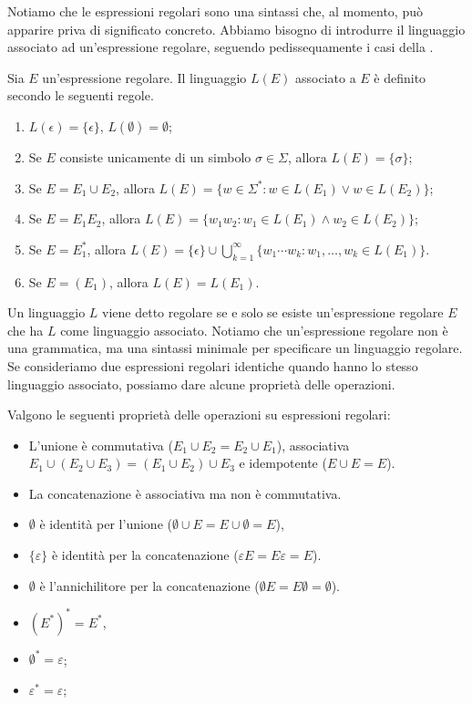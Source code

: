 Notiamo che le espressioni regolari sono una sintassi che, al momento, può apparire priva di significato concreto.
Abbiamo bisogno di introdurre il linguaggio associato ad un'espressione regolare, seguendo pedissequamente i casi della .

\begin{definition}\label{def:regex-linguaggio}
	Sia $E$ un'espressione regolare. Il linguaggio $L(E)$ associato a $E$ è definito secondo le seguenti regole.
	\begin{enumerate}
		\item $L(\epsilon) = \{\epsilon\}$, $L(\emptyset) = \emptyset$;
		\item Se $E$ consiste unicamente di un simbolo $\sigma\in\Sigma$, allora $L(E) = \{\sigma\}$;
		\item Se $E=E_1 \cup E_2$, allora $L(E) = \{w\in \Sigma^{*} : w\in L(E_{1}) \vee  w\in L(E_{2})\}$;
		\item Se $E=E_1E_2$, allora $L(E) = \{ w_{1}w_{2} : w_1\in L(E_1) \wedge w_2\in L(E_2) \}$;
		\item Se $E = E_1^{*}$, allora $L(E) = \{\epsilon\} \cup \bigcup_{k=1}^{\infty} \{w_1 \cdots w_{k}: w_{1}, \ldots, w_{k}\in L(E_1) \}$.
		\item Se $E = (E_1)$, allora $L(E) = L(E_1)$.
	\end{enumerate}
\end{definition}

Un linguaggio $L$ viene detto regolare se e solo se esiste un'espressione regolare $E$ che ha $L$ come linguaggio associato.
Notiamo che un'espressione regolare non è una grammatica, ma una sintassi minimale per specificare un linguaggio regolare.
Se consideriamo due espressioni regolari identiche quando hanno lo stesso linguaggio associato, possiamo dare alcune proprietà delle operazioni.

\begin{proposition}\label{prop:regex-associative-commutative}
	Valgono le seguenti proprietà delle operazioni su espressioni regolari:
	\begin{itemize}
		\item
		      L'unione è commutativa ($E_1 \cup E_2 = E_2 \cup E_1$), associativa $E_1 \cup (E_2 \cup E_3) = (E_1 \cup E_2) \cup E_3$
		      e idempotente ($E\cup E = E$).
		\item
		      La concatenazione è associativa ma non è commutativa.
		\item
		      $\emptyset$ è identità per l'unione ($\emptyset \cup E = E \cup \emptyset = E$),
		\item
		      $ \{\varepsilon \} $ è identità per la concatenazione
		      ($\varepsilon E=E\varepsilon=E$).
		\item
		      $\emptyset$ è l'annichilitore per la concatenazione ($\emptyset E=E\emptyset=\emptyset$).
		\item
		      $(E^{*})^{*}=E^{*}$,
		\item
		      $\emptyset^*=\varepsilon$;
		\item
		      $\varepsilon^*=\varepsilon$;
	\end{itemize}
\end{proposition}

